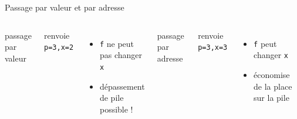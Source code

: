 \documentclass[11pt,mathserif]{beamer}
\newcommand{\scout}{\faAngellist}
\newcommand{\argi}{\faLightbulbO}
\newcommand{\kontuz}{\faExclamationTriangle}
\newcommand{\triste}{\faFrownO}
\newcommand{\mylang}{c}
\newcommand{\extlang}{c}
\newcommand{\mylang}{fortran}
\newcommand{\extlang}{f90}
\newcommand{\includeSrc}[1]{}
\begin{document}
\begin{frame}{Passage par valeur et par adresse }
\begin{columns}[t]
\pause
\column{5cm}
 passage par valeur
  \includeSrc{code/valeur}
  renvoie \lstinline! p=3,x=2!
  \begin{itemize}
    \item[\triste] {\tt f} ne peut pas changer {\tt x}
    \item[\kontuz] dépassement de pile possible !
   \end{itemize} 
\pause
\column{5cm}
 passage par adresse
  \includeSrc{code/adresse}
  renvoie \lstinline! p=3,x=3!
  \begin{itemize}
    \item[\scout] {\tt f} peut changer {\tt x}
    \item[\argi] économise de la place sur la pile
   \end{itemize} 
\end{columns}
\end{frame}
\fi %
\end{document}
